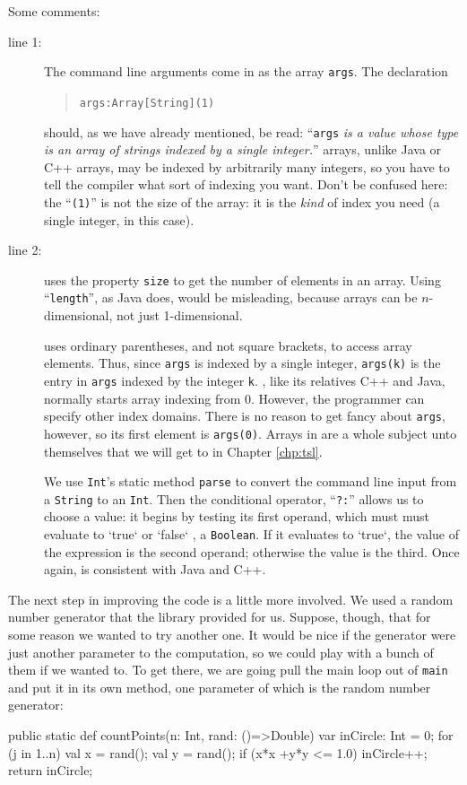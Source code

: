 Some comments:
\begin{description}
\item[line 1:]
The command line arguments come in as the array {\tt args}.  The declaration
\begin{quote} {\tt args:Array[String](1)}  \end{quote}
should, as we have already mentioned, be read: ``{\tt args} {\em is a value whose type
is an array of strings indexed by a single integer.}''   \Xten{} arrays, unlike Java
or C++ arrays, may be indexed by arbitrarily many integers, so you have to 
tell the compiler what sort of indexing you want.  Don't be confused here: the
``{\tt (1)}'' is not the size of the array: it is the {\em kind} of index you
need (a single integer, in this case).
\item[line 2:]
 \Xten{} uses the property {\tt size} to get the number of elements in
an array.  Using ``{\tt length}'', as Java does,
would be misleading, because \Xten{} arrays can be $n$-dimensional, not just
1-dimensional.

\Xten{} uses ordinary parentheses, and not square brackets, to access array elements.  
Thus, since {\tt args} is indexed by a single integer, {\tt args(k)} is the
entry in {\tt args} indexed by the integer {\tt k}.  \Xten, like its relatives
C++ and Java, normally starts array indexing from 0.  However, the \Xten{} programmer can
specify other index domains. There is no reason to get fancy about {\tt args}, however,
so its first element is {\tt args(0)}. Arrays in \Xten{} are a whole subject unto
themselves that we will get to in Chapter \ref{chp:tsl}.

We use {\tt Int}'s static method {\tt parse} to convert the command line input
from a {\tt String} to an {\tt Int}.  Then the conditional operator, 
``{\tt ?:}'' allows us to choose a value:
it begins by testing its first operand, which must must evaluate to \xcd`true`
or 
\xcd`false`
, \ie{} a {\tt Boolean}. If it evaluates to \xcd`true`, the value of the
expression is the second operand; otherwise the value is the third.
Once again, \Xten{} is consistent with Java and C++.
\end{description} 
The next step in improving the code is a little more involved.
We used a random number generator
that the \Xten{} library provided for us.  Suppose, though,
that for some reason we wanted to try another one. 
It would be nice if the generator
were just another parameter to the computation, so we could play with a bunch
of them if we wanted to.  To get there, we are going pull the main loop
out of {\tt main} and put it in its own method, one parameter of which is the
random number generator:
\begin{xtennum}[]
   public static def countPoints(n: Int, rand: ()=>Double) {
      var inCircle: Int = 0;
      for (j in 1..n) {
         val x = rand();
         val y = rand();
         if (x*x +y*y <= 1.0) inCircle++;
      }
      return inCircle;
   }
\end{xtennum}
 


